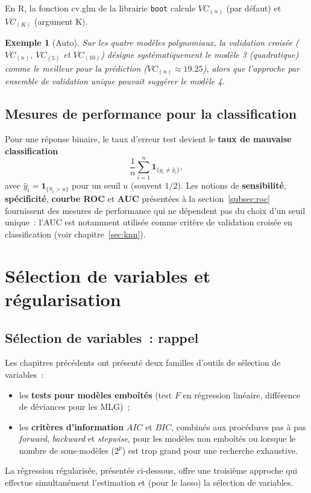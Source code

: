 \documentclass[11pt,letterpaper]{article}
\newtheorem{exemple}{Exemple}[section]
\begin{document}
En \textrm{R}, la fonction \textsf{cv.glm} de la librairie \texttt{boot} calcule $VC_{(n)}$ (par défaut) et $VC_{(K)}$ (argument \textsf{K}).

\begin{exemple}[\textsf{Auto}]
Sur les quatre modèles polynomiaux, la validation croisée ($VC_{(n)}$, $VC_{(5)}$ et $VC_{(10)}$) désigne systématiquement le modèle 3 (quadratique) comme le meilleur pour la prédiction ($VC_{(n)} \approx 19.25$), alors que l'approche par ensemble de validation unique pouvait suggérer le modèle 4.
\end{exemple}

\subsection{Mesures de performance pour la classification}

Pour une réponse binaire, le taux d'erreur test devient le \textbf{taux de mauvaise classification}
$$\frac{1}{n}\sum_{i=1}^n \mathbf{1}_{\{y_i \neq \hat y_i\}},$$
avec $\hat y_i = \mathbf{1}_{\{\hat\pi_i > u\}}$ pour un seuil $u$ (souvent $1/2$). Les notions de \textbf{sensibilité}, \textbf{spécificité}, \textbf{courbe ROC} et \textbf{AUC} présentées à la section~\ref{subsec:roc} fournissent des mesures de performance qui ne dépendent pas du choix d'un seuil unique~: l'AUC est notamment utilisée comme critère de validation croisée en classification (voir chapitre~\ref{sec:knn}).

\newpage
\section{Sélection de variables et régularisation}
\label{sec:regularisation}

\subsection{Sélection de variables~: rappel}

Les chapitres précédents ont présenté deux familles d'outils de sélection de variables~:
\begin{itemize}
\item les \textbf{tests pour modèles emboîtés} (test $F$ en régression linéaire, différence de déviances pour les MLG)~;
\item les \textbf{critères d'information} $AIC$ et $BIC$, combinés aux procédures pas à pas \textit{forward}, \textit{backward} et \textit{stepwise}, pour les modèles non emboîtés ou lorsque le nombre de sous-modèles ($2^p$) est trop grand pour une recherche exhaustive.
\end{itemize}
La régression régularisée, présentée ci-dessous, offre une troisième approche qui effectue simultanément l'estimation et (pour le lasso) la sélection de variables.
\end{document}
